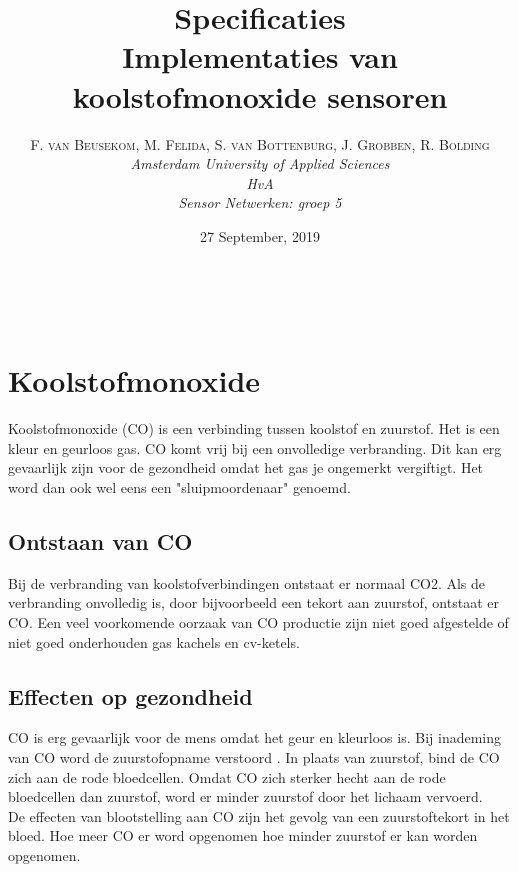 \documentclass[a4paper, 11pt]{article} %
\title{\textbf{Specificaties}\\ %
Implementaties van koolstofmonoxide sensoren} %
\author{\textsc{F. van Beusekom, M. Felida, S. van Bottenburg, J. Grobben, R. Bolding} %
\\{\textit{Amsterdam University of Applied Sciences\\ 
HvA\\
Sensor Netwerken: groep 5}}} %
\date{27 September, 2019} %
\makeatletter
\renewcommand{\maketitle}{ %
\begin{flushright} %
{\LARGE\@title} %

\vspace{50pt} %

{\large\@author} %
\\\@date %

\vspace{40pt} %
\end{flushright}
}
\makeatother
\begin{document}
\captionsetup{justification=centering}
\hypersetup{hidelinks=true}
\maketitle %




\vspace{10pt} %

\newpage
\section{Koolstofmonoxide}
Koolstofmonoxide (CO) is een verbinding tussen koolstof en zuurstof. Het is een kleur en geurloos gas. CO komt vrij bij een onvolledige verbranding. Dit kan erg gevaarlijk zijn voor de gezondheid omdat het gas je ongemerkt vergiftigt. Het word dan ook wel eens een "sluipmoordenaar" genoemd. 

\subsection{Ontstaan van CO}
Bij de verbranding van koolstofverbindingen ontstaat er normaal CO2. Als de verbranding onvolledig is, door bijvoorbeeld een tekort aan zuurstof, ontstaat er CO. Een veel voorkomende oorzaak van CO productie zijn niet goed afgestelde of niet goed onderhouden gas kachels en cv-ketels.

\subsection{Effecten op gezondheid}
CO is erg gevaarlijk voor de mens omdat het geur en kleurloos is. Bij inademing van CO word de zuurstofopname verstoord \cite{Effecten Koolmonoxide}. In plaats van zuurstof, bind de CO zich aan de rode bloedcellen. Omdat CO zich sterker hecht aan de rode bloedcellen dan zuurstof, word er minder zuurstof door het lichaam vervoerd. 
\\
De effecten van blootstelling aan CO zijn het gevolg van een zuurstoftekort in het bloed. Hoe meer CO er word opgenomen hoe minder zuurstof er kan worden opgenomen. 
\end{document}

